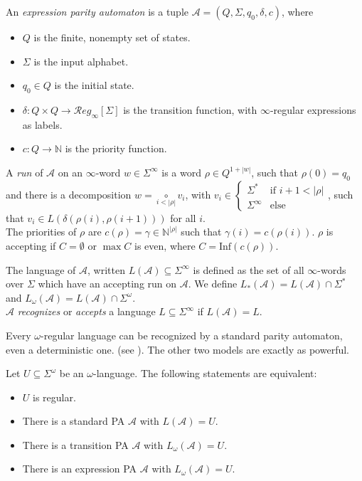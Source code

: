 \begin{defn}
	An \emph{expression parity automaton} is a tuple $\mathcal{A} = (Q, \Sigma, q_0, \delta, c)$, where
	\begin{itemize}
		\item $Q$ is the finite, nonempty set of states.
		\item $\Sigma$ is the input alphabet.
		\item $q_0 \in Q$ is the initial state.
		\item $\delta : Q \times Q \rightarrow \mathcal{R}eg_\infty[\Sigma]$ is the transition function, with $\infty$-regular expressions as labels.
		\item $c : Q \rightarrow \mathbb{N}$ is the priority function.
	\end{itemize}
	
	A \emph{run} of $\mathcal{A}$ on an $\infty$-word $w \in \Sigma^\infty$ is a word $\rho \in Q^{1 + |w|}$, such that $\rho(0) = q_0$ and there is a decomposition $w = \underset{i < |\rho|}{\circ} v_i$, with $v_i \in \begin{cases}\Sigma^* & \text{if } i+1 < |\rho| \\ \Sigma^\infty & \text{else} \end{cases}$, such that $v_i \in L(\delta(\rho(i), \rho(i+1)))$ for all  $i$. \\
	The priorities of $\rho$ are $c(\rho) = \gamma \in \mathbb{N}^{|\rho|}$ such that $\gamma(i) = c(\rho(i))$. $\rho$ is accepting if $C = \emptyset$ or $\max C$ is even, where $C = \text{Inf}(c(\rho))$.
	
	The language of $\mathcal{A}$, written $L(\mathcal{A}) \subseteq \Sigma^\infty$ is defined as the set of all $\infty$-words over $\Sigma$ which have an accepting run on $\mathcal{A}$. We define $L_*(\mathcal{A}) = L(\mathcal{A}) \cap \Sigma^*$ and $L_\omega(\mathcal{A}) = L(\mathcal{A}) \cap \Sigma^\omega$. \\
	$\mathcal{A}$ \emph{recognizes} or \emph{accepts} a language $L \subseteq \Sigma^\infty$ if $L(\mathcal{A}) = L$.
\end{defn}


Every $\omega$-regular language can be recognized by a standard parity automaton, even a deterministic one. (see \cite{Thomas96}). The other two models are exactly as powerful.

\begin{prop}
	Let $U \subseteq \Sigma^\omega$ be an $\omega$-language. The following statements are equivalent:
	\begin{itemize}
		\item $U$ is regular.
		\item There is a standard PA $\mathcal{A}$ with $L(\mathcal{A}) = U$.
		\item There is a transition PA $\mathcal{A}$ with $L_\omega(\mathcal{A}) = U$.
		\item There is an expression PA $\mathcal{A}$ with $L_\omega(\mathcal{A}) = U$.
	\end{itemize}
\end{prop}

